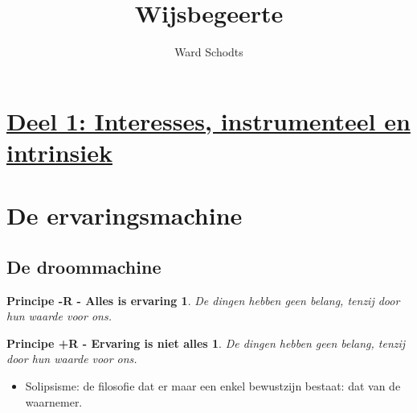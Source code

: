 \documentclass[11pt,a4paper]{article}
\begin{document}
\title{\huge Wijsbegeerte}
\author{Ward Schodts}
\date{}
\maketitle


\section*{\centering \underline{Deel 1: Interesses, instrumenteel en intrinsiek}}

\section{De ervaringsmachine}
\subsection{De droommachine}
\newtheorem*{-R}{Principe -R - Alles is ervaring}
\begin{-R}
De dingen hebben geen belang, tenzij door hun waarde voor ons.
\end{-R}
\newtheorem*{+R}{Principe +R - Ervaring is niet alles}
\begin{+R}
De dingen hebben geen belang, tenzij door hun waarde voor ons.
\end{+R}
\begin{itemize}
\item Solipsisme: de filosofie dat er maar een enkel bewustzijn bestaat: dat van de waarnemer.
\end{itemize}
\end{document}
